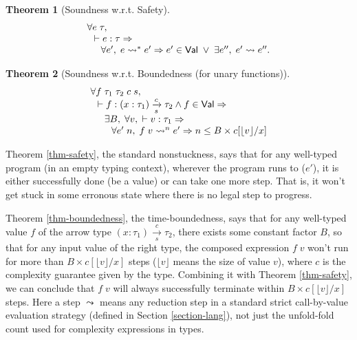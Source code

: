 \documentclass[preprint]{sigplanconf}
\newcommand{\arrow}[4]{#1\xrightarrow[#3]{#2}#4}
\newcommand{\vtos}[1]{\lfloor #1 \rfloor}
\newtheorem{thm}{Theorem}
\begin{document}
\begin{thm}[\label{thm-safety}Soundness w.r.t. Safety]
$$
\begin{array}{l}
\forall e\;\tau, \\
\hspace{.1in} \vdash e:\tau \Rightarrow \\
\hspace{.2in} \forall e',\; e \leadsto^* e' \Rightarrow e'\in\mathsf{Val} \;\vee\; \exists e'',\;e' \leadsto e''.
\end{array}
$$
\end{thm}

\begin{thm}[\label{thm-boundedness}Soundness w.r.t. Boundedness (for unary functions)]
$$
\begin{array}{l}
\forall f\;\tau_1\;\tau_2\;c\;s, \\
\hspace{0.1in} \vdash f:\arrow{(x:\tau_1)}{c}{s}{\tau_2} \wedge f\in\mathsf{Val}\Rightarrow \\
\hspace{0.2in} \exists B, \;\forall v,\; \vdash v:\tau_1 \Rightarrow \\
\hspace{0.3in} \forall e'\;n,\; f\;v\leadsto^n e' \Rightarrow n\leq B\times c[\vtos{v}/x]
\end{array}
$$
\end{thm}

Theorem \ref{thm-safety}, the standard nonstuckness, says that for any well-typed program (in an empty typing context), wherever the program runs to ($e'$), it is either successfully done (be a value) or can take one more step. That is, it won't get stuck in some erronous state where there is no legal step to progress.

Theorem \ref{thm-boundedness}, the time-boundedness, says that for any well-typed value $f$ of the arrow type $\arrow{(x:\tau_1)}{c}{s}{\tau_2}$, there exists some constant factor $B$, so that for any input value of the right type, the composed expression $f\;v$ won't run for more than $B\times c[\vtos{v}/x]$ steps ($\vtos{v}$ means the size of value $v$), where $c$ is the complexity guarantee given by the type. Combining it with Theorem \ref{thm-safety}, we can conclude that $f\;v$ will always successfully terminate within $B\times c[\vtos{v}/x]$ steps. Here a step $\leadsto$ means any reduction step in a standard strict call-by-value evaluation strategy (defined in Section \ref{section-lang}), not just the unfold-fold count used for complexity expressions in types. 
\end{document}
